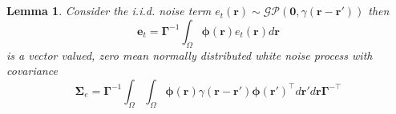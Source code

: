 \documentclass[10pt,a4paper]{article}
\newcommand{\dean}[1]{\textsf{\emph{\textbf{\textcolor{green}{#1}}}}}
\begin{document}
\section{}\label{ColoredNoise} 
\newtheorem{lemma}{Lemma} 
\begin{lemma}
	Consider the i.i.d. noise term $e_t(\mathbf{r})\sim\mathcal{GP}(\mathbf 0,\gamma(\mathbf{r}-\mathbf{r'}))$ then 
	\begin{equation}\label{eq:AppendixWt} 
		\mathbf e_t=\boldsymbol{\Gamma}^{-1}\int_\Omega {\boldsymbol{\phi} ( \mathbf{r} )e_t( \mathbf{r} )d\mathbf{r}} 
	\end{equation}
	is a vector valued, zero mean normally distributed white noise process with covariance 
	\begin{equation}
		\boldsymbol\Sigma_e =\mathbf{\Gamma}^{-1}\int_{\Omega}\int_{\Omega}\boldsymbol{\phi}\left(\mathbf r\right) \gamma\left(\mathbf r- \mathbf r' \right)\boldsymbol{\phi}\left(\mathbf r'\right)^{\top}d\mathbf r' d\mathbf r\mathbf{\Gamma}^{- \top} 
	\end{equation}
	\label{lemma:FieldCovariance} 
\end{lemma}
\end{document}
